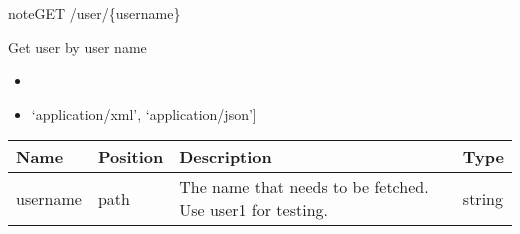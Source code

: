 \documentclass[letterpaper,10pt,english]{sphinxmanual}
\begin{document}
\begin{sphinxadmonition}{note}{GET /user/\{username\}}

Get user by user name\begin{itemize}
\item {} 

\item {} 
\sphinxstylestrong{Produces: 
}{[}‘application/xml’, ‘application/json’{]}

\end{itemize}




\begin{savenotes}\sphinxattablestart
\centering
\begin{tabulary}{\linewidth}[t]{|T|T|T|T|}
\hline
\sphinxstyletheadfamily 
Name
&\sphinxstyletheadfamily 
Position
&\sphinxstyletheadfamily 
Description
&\sphinxstyletheadfamily 
Type
\\
\hline
username
&
path
&
The name that needs to be fetched. Use user1 for testing. 
&
string
\\
\hline
\end{tabulary}
\par
\sphinxattableend\end{savenotes}




\end{sphinxadmonition}
\end{document}
